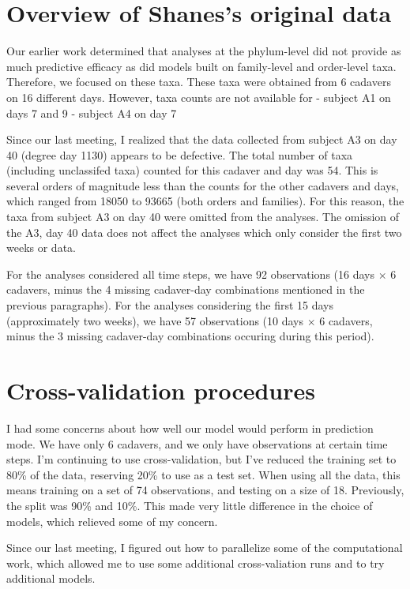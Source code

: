 \documentclass{article}
\begin{document}
\section{Overview of Shanes's original data}

Our earlier work determined that analyses at the phylum-level did not
provide as much predictive efficacy as did models built on
family-level and order-level taxa.  Therefore, we focused on these
taxa.  These taxa were obtained from 6 cadavers on 16 different days.
However, taxa counts are not available for
- subject A1 on days 7 and 9
- subject A4 on day 7


Since our last meeting, I realized that the data collected from
subject A3 on day 40 (degree day 1130) appears to be defective.  The
total number of taxa (including unclassifed taxa) counted for this
cadaver and day was 54.  This is several orders of magnitude less than
the counts for the other cadavers and days, which ranged from 18050 to
93665 (both orders and families).  For this reason, the taxa from
subject A3 on day 40 were omitted from the analyses.  The omission of
the A3, day 40 data does not affect the analyses which only consider
the first two weeks or data.

For the analyses considered all time steps, we have 92 observations
(16 days $\times$ 6 cadavers, minus the 4 missing cadaver-day
combinations mentioned in the previous paragraphs).  For the analyses
considering the first 15 days (approximately two weeks), we have 57
observations (10 days $\times$ 6 cadavers, minus the 3 missing
cadaver-day combinations occuring during this period).


\section{Cross-validation procedures}

I had some concerns about how well our model would perform in
prediction mode.  We have only 6 cadavers, and we only have
observations at certain time steps.  I'm continuing to use
cross-validation, but I've reduced the training set to 80\% of the
data, reserving 20\% to use as a test set.  When using all the data,
this means training on a set of 74 observations, and testing on a size
of 18.  Previously, the split was 90\% and 10\%.  This made very
little difference in the choice of models, which relieved some of my
concern.

Since our last meeting, I figured out how to parallelize some of the
computational work, which allowed me to use some additional
cross-valiation runs and to try additional models.
\end{document}

